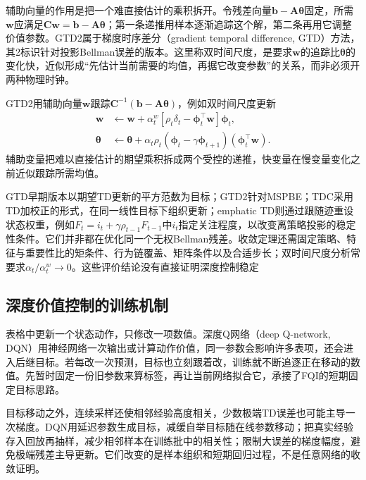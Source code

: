 辅助向量的作用是把一个难直接估计的乘积拆开。令残差向量$\bm b-\bm A\bm\theta$固定，所需$\bm w$应满足$\bm C\bm w=\bm b-\bm A\bm\theta$；第一条递推用样本逐渐追踪这个解，第二条再用它调整价值参数。GTD2属于梯度时序差分（gradient temporal difference, GTD）方法，其2标识针对投影Bellman误差的版本。这里称双时间尺度，是要求$\bm w$的追踪比$\bm\theta$的变化快，近似形成“先估计当前需要的均值，再据它改变参数”的关系，而非必须开两种物理时钟。

GTD2用辅助向量$\bm w$跟踪$\bm C^{-1}(\bm b-\bm A\bm\theta)$，例如双时间尺度更新
\begin{align}
  \bm w&\leftarrow\bm w+\alpha_t^w
     [\rho_t\delta_t-\bm\phi_t^\top\bm w]\bm\phi_t,
     \nonumber\\
  \bm\theta&\leftarrow\bm\theta+\alpha_t\rho_t
     (\bm\phi_t-\gamma\bm\phi_{t+1})(\bm\phi_t^\top\bm w).
  \label{eq:rl-learning-gtd2}
\end{align}
辅助变量把难以直接估计的期望乘积拆成两个受控的递推，快变量在慢变量变化之前近似跟踪所需均值。

GTD早期版本以期望TD更新的平方范数为目标；GTD2针对MSPBE；TDC采用TD加校正的形式，在同一线性目标下组织更新；emphatic TD则通过跟随迹重设状态权重，例如$F_t=i_t+\gamma\rho_{t-1}F_{t-1}$中$i_t$指定关注程度，以改变离策略投影的稳定性条件。它们并非都在优化同一个无权Bellman残差。收敛定理还需固定策略、特征与重要性比的矩条件、行为链覆盖、矩阵条件以及合适步长；双时间尺度分析常要求$\alpha_t/\alpha_t^w\to0$。这些评价结论没有直接证明深度控制稳定

\subsection{深度价值控制的训练机制}
\label{sec:rl-learning-dqn}

表格中更新一个状态动作，只修改一项数值。深度Q网络（deep Q-network, DQN）用神经网络一次输出或计算动作价值，同一参数会影响许多表项，还会进入后继目标。若每改一次预测，目标也立刻跟着改，训练就不断追逐正在移动的数值。先暂时固定一份旧参数来算标签，再让当前网络拟合它，承接了FQI的短期固定目标思路。

目标移动之外，连续采样还使相邻经验高度相关，少数极端TD误差也可能主导一次梯度。DQN用延迟参数生成目标，减缓自举目标随在线参数移动；把真实经验存入回放再抽样，减少相邻样本在训练批中的相关性；限制大误差的梯度幅度，避免极端残差主导更新。它们改变的是样本组织和短期回归过程，不是任意网络的收敛证明。

